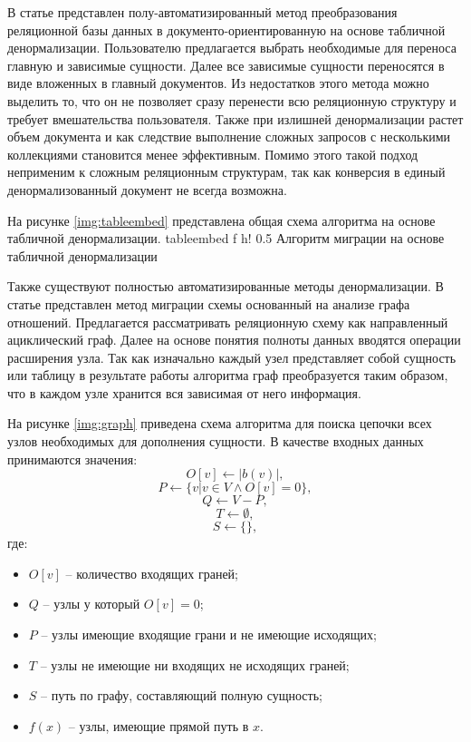В статье \cite{embedding} представлен полу-автоматизированный метод преобразования реляционной базы данных в документо-ориентированную на основе табличной денормализации.
Пользователю предлагается выбрать необходимые для переноса главную и зависимые сущности. 
Далее все зависимые сущности переносятся в виде вложенных в главный документов.
Из недостатков этого метода можно выделить то, что он не позволяет сразу перенести всю реляционную структуру и требует вмешательства пользователя.
Также при излишней денормализации растет объем документа и как следствие выполнение сложных запросов с несколькими коллекциями становится менее эффективным.
Помимо этого такой подход неприменим к сложным реляционным структурам, так как конверсия в единый денормализованный документ не всегда возможна.

На рисунке \ref{img:tableembed} представлена общая схема алгоритма на основе табличной денормализации.
    {tableembed} %
    {f} %
    {h!} %
    {0.5\textwidth} %
    {Алгоритм миграции на основе табличной денормализации} %

\clearpage

Также существуют полностью автоматизированные методы денормализации.
В статье \cite{graphmethod} представлен метод миграции схемы основанный на анализе графа отношений.
Предлагается рассматривать реляционную схему как направленный ациклический граф.
Далее на основе понятия полноты данных вводятся операции расширения узла.
Так как изначально каждый узел представляет собой сущность или таблицу в результате работы алгоритма граф преобразуется таким образом, что в каждом узле хранится вся зависимая от него информация.

На рисунке \ref{img:graph} приведена схема алгоритма для поиска цепочки всех узлов необходимых для дополнения сущности.
В качестве входных данных принимаются значения:
$$O[v] \leftarrow |b(v)|,$$
$$P \leftarrow  \{v | v \in V \wedge O[v] = 0\},$$
$$Q \leftarrow V - P,$$
$$T \leftarrow \emptyset,$$
$$ S \leftarrow \{\},$$
где:
\begin{itemize}[label=---]
    \item $O[v]$ -- количество входящих граней;
    \item $Q$ -- узлы у который $O[v] = 0$;
    \item $P$ -- узлы имеющие входящие грани и не имеющие исходящих;
    \item $T$ -- узлы не имеющие ни входящих не исходящих граней;
    \item $S$ -- путь по графу, составляющий полную сущность;
    \item $f(x)$ -- узлы, имеющие прямой путь в $x$.
\end{itemize}

